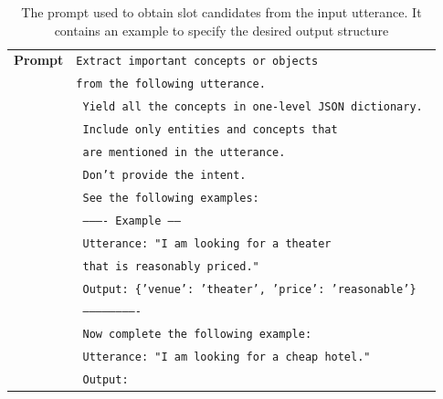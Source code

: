 \begin{table}[h]
    \centering
    \begin{tabular}{r|l}
    \toprule
        \textbf{Prompt} & \texttt{{\color{cyan!80!yellow!80!black!100 }Extract important concepts or objects }}\\
        & \texttt{{\color{cyan!80!yellow!80!black!100 }from the following utterance. }} \\
        & \texttt{{\color{cyan!80!yellow!80!black!100 } Yield all the concepts in one-level JSON dictionary. }} \\
        & \texttt{{\color{cyan!80!yellow!80!black!100 } Include only entities and concepts that}} \\
        & \texttt{{\color{cyan!80!yellow!80!black!100 } are mentioned in the utterance.}} \\
        & \texttt{{\color{cyan!80!yellow!80!black!100 } Don't provide the intent.}} \\
        & \texttt{{\color{cyan!80!yellow!80!black!100 } See the following examples:}} \\
        & \texttt{{\color{orange!50!yellow!90!black!100!} ---------- Example ------}} \\
        & \texttt{{\color{orange!50!yellow!90!black!100!} Utterance: "I am looking for a theater }} \\
        & \texttt{{\color{orange!50!yellow!90!black!100!} that is reasonably priced." }} \\
        & \texttt{{\color{orange!50!yellow!90!black!100!} Output: \{'venue': 'theater', 'price': 'reasonable'\} }} \\
        & \texttt{{\color{orange!50!yellow!90!black!100!} -------------------------}} \\
        & \texttt{{\color{cyan!80!yellow!80!black!100 } Now complete the following example: }} \\
        & \texttt{{\color{cyan!80!yellow!80!black!100 } Utterance:}  {\color{red!100!yellow!90!black!100!}"I am looking for a cheap hotel."}} \\
        & \texttt{{\color{cyan!80!yellow!80!black!100 } Output:  }} \\
        \bottomrule
    \end{tabular}
    \caption{The {\color{cyan!80!yellow!80!black!100 }prompt} used to obtain slot candidates from the input utterance. It contains an {\color{orange!50!yellow!90!black!100!} example} to specify the desired output structure }
    \label{04:tab:prompt}
\end{table}

